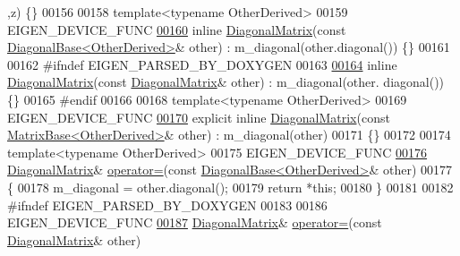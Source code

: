 \begin{DoxyCode}
      ,z) \{\}
00156 
00158     \textcolor{keyword}{template}<\textcolor{keyword}{typename} OtherDerived>
00159     EIGEN\_DEVICE\_FUNC
\hyperlink{group___core___module_ad7d030d35ab1f1b2f3e51860069f4226}{00160}     \textcolor{keyword}{inline} \hyperlink{group___core___module_ad7d030d35ab1f1b2f3e51860069f4226}{DiagonalMatrix}(\textcolor{keyword}{const} \hyperlink{class_eigen_1_1_diagonal_base}{DiagonalBase<OtherDerived>}& other) 
      : m\_diagonal(other.diagonal()) \{\}
00161 
00162 \textcolor{preprocessor}{    #ifndef EIGEN\_PARSED\_BY\_DOXYGEN}
00163 
\hyperlink{group___core___module_ad5efd7a4e35667a76cdbbdb664bb92c5}{00164}     \textcolor{keyword}{inline} \hyperlink{group___core___module_ad5efd7a4e35667a76cdbbdb664bb92c5}{DiagonalMatrix}(\textcolor{keyword}{const} \hyperlink{group___core___module_class_eigen_1_1_diagonal_matrix}{DiagonalMatrix}& other) : m\_diagonal(other.
      diagonal()) \{\}
00165 \textcolor{preprocessor}{    #endif}
00166 
00168     \textcolor{keyword}{template}<\textcolor{keyword}{typename} OtherDerived>
00169     EIGEN\_DEVICE\_FUNC
\hyperlink{group___core___module_a3a6492f390f0d881f14376e673fd42c3}{00170}     \textcolor{keyword}{explicit} \textcolor{keyword}{inline} \hyperlink{group___core___module_a3a6492f390f0d881f14376e673fd42c3}{DiagonalMatrix}(\textcolor{keyword}{const} \hyperlink{group___core___module_class_eigen_1_1_matrix_base}{MatrixBase<OtherDerived>}& 
      other) : m\_diagonal(other)
00171     \{\}
00172 
00174     \textcolor{keyword}{template}<\textcolor{keyword}{typename} OtherDerived>
00175     EIGEN\_DEVICE\_FUNC
\hyperlink{group___core___module_a0a189cd40211ce0790fb3fe218af2aed}{00176}     \hyperlink{group___core___module_class_eigen_1_1_diagonal_matrix}{DiagonalMatrix}& \hyperlink{group___core___module_a0a189cd40211ce0790fb3fe218af2aed}{operator=}(\textcolor{keyword}{const} 
      \hyperlink{class_eigen_1_1_diagonal_base}{DiagonalBase<OtherDerived>}& other)
00177     \{
00178       m\_diagonal = other.diagonal();
00179       \textcolor{keywordflow}{return} *\textcolor{keyword}{this};
00180     \}
00181 
00182 \textcolor{preprocessor}{    #ifndef EIGEN\_PARSED\_BY\_DOXYGEN}
00183 
00186     EIGEN\_DEVICE\_FUNC
\hyperlink{group___core___module_a28c7f367f27a1fa0791e46e756e1c287}{00187}     \hyperlink{group___core___module_class_eigen_1_1_diagonal_matrix}{DiagonalMatrix}& \hyperlink{group___core___module_a28c7f367f27a1fa0791e46e756e1c287}{operator=}(\textcolor{keyword}{const} \hyperlink{group___core___module_class_eigen_1_1_diagonal_matrix}{DiagonalMatrix}& other)

\end{DoxyCode}
